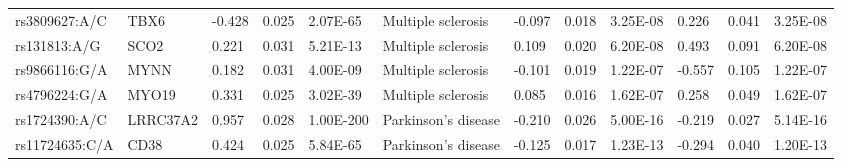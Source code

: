 \begin{table}[]
{\begin{tabular}{llllllllllll}
		\rowcolor[HTML]{BEBEBE}rs3809627:A/C                    & TBX6                              & -0.428                            & 0.025                           & 2.07E-65                       & Multiple sclerosis                         & -0.097                            & 0.018                           & 3.25E-08                       & 0.226                           & 0.041                           & 3.25E-08                       \\
		\rowcolor[HTML]{BEBEBE}rs131813:A/G                     & SCO2                              & 0.221                             & 0.031                           & 5.21E-13                       & Multiple sclerosis                         & 0.109                             & 0.020                           & 6.20E-08                       & 0.493                           & 0.091                           & 6.20E-08                       \\
		\rowcolor[HTML]{BEBEBE}rs9866116:G/A                    & MYNN                              & 0.182                             & 0.031                           & 4.00E-09                       & Multiple sclerosis                         & -0.101                            & 0.019                           & 1.22E-07                       & -0.557                          & 0.105                           & 1.22E-07                       \\
		\rowcolor[HTML]{BEBEBE}rs4796224:G/A                    & MYO19                             & 0.331                             & 0.025                           & 3.02E-39                       & Multiple sclerosis                         & 0.085                             & 0.016                           & 1.62E-07                       & 0.258                           & 0.049                           & 1.62E-07                       \\
		\rowcolor[HTML]{E0E0E0}rs1724390:A/C                    & LRRC37A2                          & 0.957                             & 0.028                           & 1.00E-200                      & Parkinson’s disease                        & -0.210                            & 0.026                           & 5.00E-16                       & -0.219                          & 0.027                           & 5.14E-16                       \\
		\rowcolor[HTML]{E0E0E0}rs11724635:C/A                   & CD38                              & 0.424                             & 0.025                           & 5.84E-65                       & Parkinson’s disease                        & -0.125                            & 0.017                           & 1.23E-13                       & -0.294                          & 0.040                           & 1.20E-13                       \\

\end{tabular}}
\end{table}
